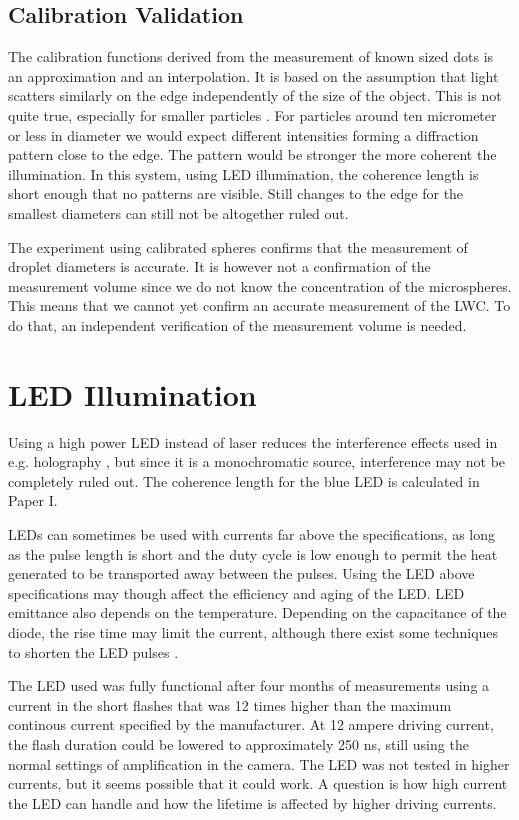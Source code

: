 \subsection{Calibration Validation}

The calibration functions derived from the measurement of known sized dots is an approximation and an interpolation. It is based on the assumption that light scatters similarly on the edge independently of the size of the object. This is not quite true, especially for smaller particles \cite{bohr2008}. For particles around ten micrometer or less in diameter we would expect different intensities forming a diffraction pattern close to the edge. The pattern would be stronger the more coherent the illumination. In this system, using LED illumination, the coherence length is short enough that no patterns are visible. Still changes to the edge for the smallest diameters can still not be altogether ruled out.

The experiment using calibrated spheres confirms that the measurement of droplet diameters is accurate. It is however not a confirmation of the measurement volume \cite{ryd2016} since we do not know the concentration of the microspheres. This means that we cannot yet confirm an accurate measurement of the LWC. To do that, an independent verification of the measurement volume is needed.


\section{LED Illumination}

Using a high power LED instead of laser reduces the interference effects used in e.g. holography \cite{henn2013}, but since it is a monochromatic source, interference may not be completely ruled out. The coherence length for the blue LED is calculated in Paper I.

LEDs can sometimes be used with currents far above the specifications, as long as the pulse length is short and the duty cycle is low enough to permit the heat generated to be transported away between the pulses. Using the LED above specifications may though affect the efficiency and aging of the LED. LED emittance also depends on the temperature. Depending on the capacitance of the diode, the rise time may limit the current, although there exist some techniques to shorten the LED pulses \cite{tanaka2011,vele2007}.

The LED used was fully functional after four months of measurements using a current in the short flashes that was 12 times higher than the maximum continous current specified by the manufacturer. At 12 ampere driving current, the flash duration could be lowered to approximately 250 ns, still using the normal settings of amplification in the camera. The LED was not tested in higher currents, but it seems possible that it could work. A question is how high current the LED can handle and how the lifetime is affected by higher driving currents.

